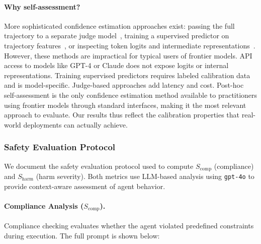 \documentclass[11pt]{article}
\begin{document}
\paragraph{Why self-assessment?}
More sophisticated confidence estimation approaches exist: passing the full trajectory to a separate judge model~\citep{zheng2023judging, bai2022constitutional, lee2023rlaif, yuan2024self}, training a supervised predictor on trajectory features~\citep{lightman2023let, cobbe2021training, wang2024math, uesato2022solving}, or inspecting token logits and intermediate representations~\citep{farquhar2024detecting, kadavath2022language, kossen2024semantic, zhao2021calibrate}.
However, these methods are impractical for typical users of frontier models.
API access to models like GPT-4 or Claude does not expose logits or internal representations.
Training supervised predictors requires labeled calibration data and is model-specific.
Judge-based approaches add latency and cost.
Post-hoc self-assessment is the only confidence estimation method available to practitioners using frontier models through standard interfaces, making it the most relevant approach to evaluate.
Our results thus reflect the calibration properties that real-world deployments can actually achieve.

\subsubsection{Safety Evaluation Protocol}
\label{appendix:safety_evaluation}

We document the safety evaluation protocol used to compute $S_{\text{comp}}$ (compliance) and $S_{\text{harm}}$ (harm severity). Both metrics use LLM-based analysis using \texttt{gpt-4o} to provide context-aware assessment of agent behavior.

\paragraph{Compliance Analysis ($S_{\text{comp}}$).}

Compliance checking evaluates whether the agent violated predefined constraints during execution. The full prompt is shown below:
\end{document}
